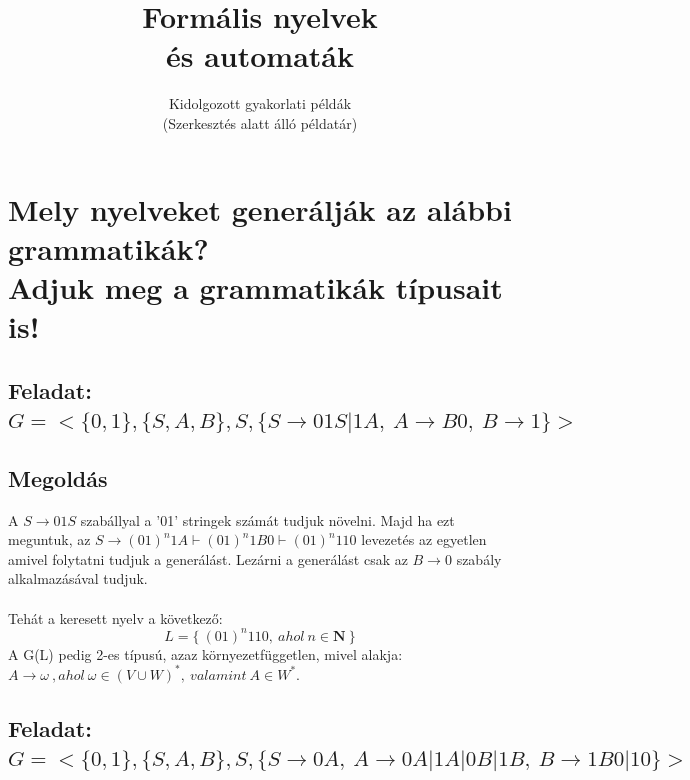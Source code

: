 \documentclass[12pt]{article}
\title{\textbf{Formális nyelvek \\ és automaták}}
\author{Kidolgozott gyakorlati példák \\ (Szerkesztés alatt álló példatár)}
\date{}
\begin{document}
\maketitle

\section{Mely nyelveket generálják az alábbi grammatikák? \\ Adjuk meg a grammatikák típusait is!}


\subsection{Feladat: \\
$ G=< \{0,1\}, \{S,A,B\}, S, \{ S \rightarrow 01S|1A,\ A \rightarrow B0,\ B \rightarrow 1 \}> $}
\maketitle
\subsection{Megoldás}
A $ S \rightarrow 01S $ szabállyal a '01' stringek számát tudjuk növelni. Majd ha ezt meguntuk, 
az $ S \rightarrow (01)^n1A \vdash (01)^n1B0 \vdash (01)^n110 $ levezetés az egyetlen amivel folytatni tudjuk 
a generálást. Lezárni a generálást csak az $ B \rightarrow 0 $ szabály alkalmazásával tudjuk. \\\\
Tehát a keresett nyelv a következő:
$$ L = \{ \ (01)^n110, \ ahol \ n \in \mathbf{N}  \ \} $$
A G(L) pedig 2-es típusú, azaz környezetfüggetlen, mivel alakja: \\
$ A \rightarrow \omega \ , ahol \ \omega \in (V \cup W)^* , \ valamint \ A \in W^*. $

\subsection{Feladat: \\
$ G=< \{0,1\}, \{S,A,B\}, S, \{ S \rightarrow 0A,\ A \rightarrow 0A|1A|0B|1B,\ B \rightarrow 1B0|10 \}> $}
\maketitle
\end{document}
